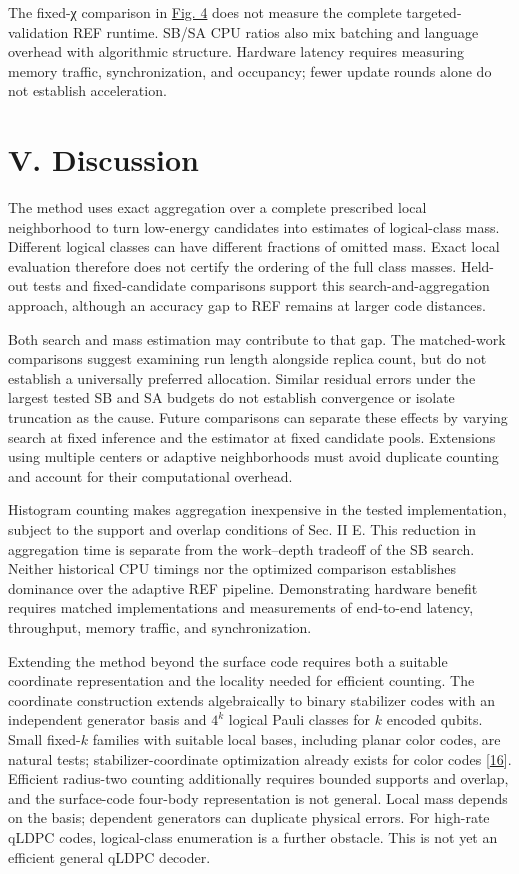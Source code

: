 \documentclass[
  10pt,
]{article}
\begin{document}
The fixed-χ comparison in \hyperref[fig:4]{Fig. 4} does not measure the complete
targeted-validation REF runtime. SB/SA CPU ratios also mix batching and
language overhead with algorithmic structure. Hardware latency requires
measuring memory traffic, synchronization, and occupancy; fewer update
rounds alone do not establish acceleration.

\section{V. Discussion}\label{v.-discussion}

The method uses exact aggregation over a complete prescribed local
neighborhood to turn low-energy candidates into estimates of
logical-class mass. Different logical classes can have different
fractions of omitted mass. Exact local evaluation therefore does not
certify the ordering of the full class masses. Held-out tests and
fixed-candidate comparisons support this search-and-aggregation
approach, although an accuracy gap to REF remains at larger code
distances.

Both search and mass estimation may contribute to that gap. The
matched-work comparisons suggest examining run length alongside replica
count, but do not establish a universally preferred allocation. Similar
residual errors under the largest tested SB and SA budgets do not
establish convergence or isolate truncation as the cause. Future
comparisons can separate these effects by varying search at fixed
inference and the estimator at fixed candidate pools. Extensions using
multiple centers or adaptive neighborhoods must avoid duplicate counting
and account for their computational overhead.

Histogram counting makes aggregation inexpensive in the tested
implementation, subject to the support and overlap conditions of Sec. II
E. This reduction in aggregation time is separate from the work--depth
tradeoff of the SB search. Neither historical CPU timings nor the
optimized comparison establishes dominance over the adaptive REF
pipeline. Demonstrating hardware benefit requires matched
implementations and measurements of end-to-end latency, throughput,
memory traffic, and synchronization.

Extending the method beyond the surface code requires both a suitable
coordinate representation and the locality needed for efficient
counting. The coordinate construction extends algebraically to binary
stabilizer codes with an independent generator basis and \(4^k\) logical
Pauli classes for \(k\) encoded qubits. Small fixed-\(k\) families with
suitable local bases, including planar color codes, are natural tests;
stabilizer-coordinate optimization already exists for color codes
{[}\hyperlink{ref:16}{16}{]}. Efficient radius-two counting additionally requires bounded
supports and overlap, and the surface-code four-body representation is
not general. Local mass depends on the basis; dependent generators can
duplicate physical errors. For high-rate qLDPC codes, logical-class
enumeration is a further obstacle. This is not yet an efficient general
qLDPC decoder.
\end{document}
